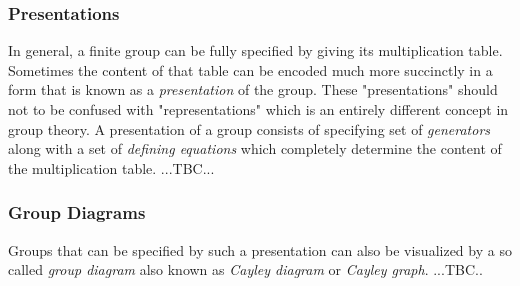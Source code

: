 \subsubsection{Presentations}

In general, a finite group can be fully specified by giving its multiplication table. Sometimes the content of that table can be encoded much more succinctly in a form that is known as a \emph{presentation} of the group. These "presentations" should not to be confused with "representations" which is an entirely different concept in group theory. A presentation of a group consists of specifying set of \emph{generators} along with a set of \emph{defining equations} which completely determine the content of the multiplication table. ...TBC...


\subsubsection{Group Diagrams}
Groups that can be specified by such a presentation can also be visualized by a so called \emph{group diagram} also known as \emph{Cayley diagram} or \emph{Cayley graph}. ...TBC..

\begin{comment}
\medskip
\begin{tikzpicture}[rotate=90,scale=1.5]
\tikzstyle{vertex}=[draw,thick,circle,fill=lightgray!50,minimum size=25pt,inner sep=0pt]
\def\k{360/5}
\draw (-0*\k : 1) node[vertex] (v1)  {$f$};
\draw (-0*\k : 2) node[vertex] (v2)  {$e$};
\draw (-1*\k : 1) node[vertex] (v3)  {$f r^4$};
\draw (-1*\k : 2) node[vertex] (v4)  {$r$};
\draw (-2*\k : 1) node[vertex] (v5)  {$f r^3$};
\draw (-2*\k : 2) node[vertex] (v6)  {$r^2$};
\draw (-3*\k : 1) node[vertex] (v7)  {$f r^2$};
\draw (-3*\k : 2) node[vertex] (v8)  {$r^3$};
\draw (-4*\k : 1) node[vertex] (v9)  {$f r$};
\draw (-4*\k : 2) node[vertex] (v10) {$r^4$};
\draw (v2) -- (v1);
\draw (v2) -- (v1);
\draw (v3) -- (v1);
\draw (v4) -- (v2);
\draw (v4) -- (v3);
\draw (v5) -- (v3);
\draw (v6) -- (v4);
\draw (v6) -- (v5);
\draw (v7) -- (v5);
\draw (v8) -- (v6);
\draw (v8) -- (v7);
\draw (v9) -- (v1);
\draw (v9) -- (v7);
\draw (v10) -- (v2);
\draw (v10) -- (v8);
\draw (v10) -- (v9);
\end{tikzpicture}
\end{comment}

